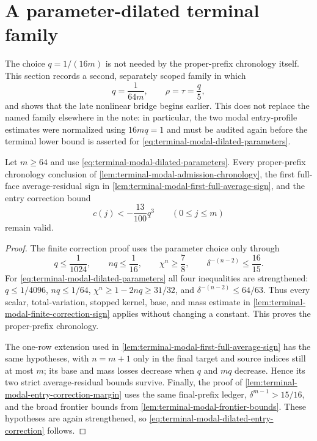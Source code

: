 \section{A parameter-dilated terminal family}
\label{sec:terminal-modal-parameter-dilation}

The choice $q=1/(16m)$ is not needed by the proper-prefix chronology itself.
This section records a second, separately scoped family in which
\begin{equation}
 q=\frac1{64m},\qquad \rho=\tau=\frac q5,
 \label{eq:terminal-modal-dilated-parameters}
\end{equation}
and shows that the late nonlinear bridge begins earlier.  This does not
replace the named family elsewhere in the note: in particular, the two modal
entry-profile estimates were normalized using $16mq=1$ and must be audited
again before the terminal lower bound is asserted for
\eqref{eq:terminal-modal-dilated-parameters}.

\begin{lemma}
\label{lem:terminal-modal-dilated-chronology}
Let $m\ge64$ and use \eqref{eq:terminal-modal-dilated-parameters}.  Every
proper-prefix chronology conclusion of
\cref{lem:terminal-modal-admission-chronology}, the first full-face
average-residual sign in
\cref{lem:terminal-modal-first-full-average-sign}, and the entry correction
bound
\begin{equation}
 c(j)<-\frac{13}{100}q^3\qquad(0\le j\le m)
 \label{eq:terminal-modal-dilated-entry-correction}
\end{equation}
remain valid.
\end{lemma}

\begin{proof}
The finite correction proof uses the parameter choice only through
\[
 q\le\frac1{1024},\qquad nq\le\frac1{16},\qquad
 \chi^n\ge\frac78,\qquad \delta^{-(n-2)}\le\frac{16}{15}.
\]
For \eqref{eq:terminal-modal-dilated-parameters} all four inequalities are
strengthened: $q\le1/4096$, $nq\le1/64$,
$\chi^n\ge1-2nq\ge31/32$, and
$\delta^{-(n-2)}\le64/63$.  Thus every scalar, total-variation, stopped
kernel, base, and mass estimate in
\cref{lem:terminal-modal-finite-correction-sign} applies without changing a
constant.  This proves the proper-prefix chronology.

The one-row extension used in
\cref{lem:terminal-modal-first-full-average-sign} has the same hypotheses,
with $n=m+1$ only in the final target and source indices still at most $m$;
its base and mass losses decrease when $q$ and $mq$ decrease.  Hence its two
strict average-residual bounds survive.  Finally, the proof of
\cref{lem:terminal-modal-entry-correction-margin} uses the same final-prefix
ledger, $\delta^{m-1}>15/16$, and the broad frontier bounds from
\cref{lem:terminal-modal-frontier-bounds}.  These hypotheses are again
strengthened, so \eqref{eq:terminal-modal-dilated-entry-correction} follows.
\end{proof}

